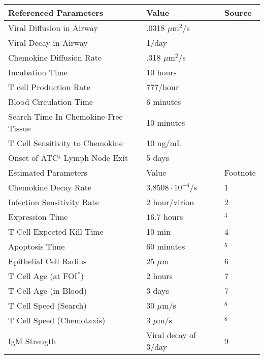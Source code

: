 \documentclass[10pt]{article}
\begin{document}
\begin{table}
\begin{center}
\begin{tabular}{| l l l |}
  \hline                        
  Referenced Parameters & Value & Source \\
  \hline
  Viral Diffusion in Airway & .0318 $\mu$m$^2$/s & \cite{Beauchemin2006} \\
  Viral Decay in Airway &  1/day & \cite{Lee2009} \\
  Chemokine Diffusion Rate & .318 $\mu$m$^2$/s & \cite{Beauchemin2006} \\
  Incubation Time &  10 hours & \cite{Mitchell2011} \\
  T cell Production Rate & 777/hour & \cite{Miao2010} \\ 
  Blood Circulation Time & 6 minutes & \cite{Banerjee2010b} \\
  Search Time In Chemokine-Free Tissue & 10 minutes & \cite{Banerjee2010b} \\
  T Cell Sensitivity to Chemokine & 10 ng/mL & \cite{Gao2003} \\
  Onset of ATC$^\ddagger$ Lymph Node Exit & 5 days & \cite{Banerjee2011} \\
  \hline
  \hline                        
  Estimated Parameters & Value & Footnote \\
  \hline
  Chemokine Decay Rate &  $3.8508\cdot10^{-4}$/s & 1\\
  Infection Sensitivity Rate &  2 hour/virion &  2 \\
  Expression Time &  16.7 hours & \cite{Mitchell2011}$^3$ \\
  T Cell Expected Kill Time & 10 min & 4 \\
  Apoptosis Time & 60 minutes & \cite{Ganusov2008}$^5$ \\
  Epithelial Cell Radius & 25 $\mu$m & 6 \\
  T Cell Age (at FOI$^\ast$) & 2 hours & 7 \\
  T Cell Age (in Blood) & 3 days & 7 \\
  T Cell Speed (Search) & 30 $\mu$m/s & \cite{Miller2003}$^8$ \\
  T Cell Speed (Chemotaxis) & 3 $\mu$m/s & \cite{Miller2003}$^8$ \\
  IgM Strength & Viral decay of 3/day & 9 \\
  \hline  
\end{tabular}

\end{center}
\end{table}
\end{document}

